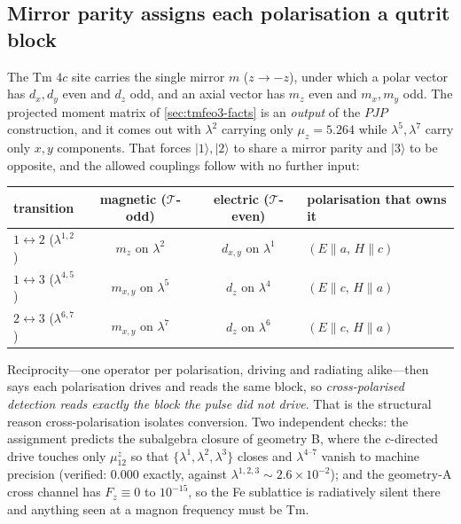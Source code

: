 \documentclass[11pt,a4paper]{article}
\newcommand{\ket}[1]{|#1\rangle}
\begin{document}
\subsection{Mirror parity assigns each polarisation a qutrit block}
\label{sec:blocks}

The Tm $4c$ site carries the single mirror $m$ ($z\to-z$), under which
a polar vector has $d_{x},d_{y}$ even and $d_z$ odd, and an axial
vector has $m_z$ even and $m_{x},m_{y}$ odd.  The projected moment
matrix of \cref{sec:tmfeo3-facts} is an \emph{output} of the $PJP$
construction, and it comes out with $\lambda^2$ carrying only
$\mu_z=5.264$ while $\lambda^5,\lambda^7$ carry only $x,y$ components.
That forces $\ket1,\ket2$ to share a mirror parity and $\ket3$ to be
opposite, and the allowed couplings follow with no further input:
\begin{center}
\renewcommand{\arraystretch}{1.3}
\begin{tabular}{lccl}
\toprule
transition & magnetic ($\mathcal T$-odd) & electric ($\mathcal T$-even)
& polarisation that owns it\\
\midrule
$1\!\leftrightarrow\!2$ ($\lambda^{1,2}$) & $m_z$ on $\lambda^2$ &
  $d_{x,y}$ on $\lambda^1$ & $(E\!\parallel\!a,\,H\!\parallel\!c)$\\
$1\!\leftrightarrow\!3$ ($\lambda^{4,5}$) & $m_{x,y}$ on $\lambda^5$ &
  $d_z$ on $\lambda^4$ & $(E\!\parallel\!c,\,H\!\parallel\!a)$\\
$2\!\leftrightarrow\!3$ ($\lambda^{6,7}$) & $m_{x,y}$ on $\lambda^7$ &
  $d_z$ on $\lambda^6$ & $(E\!\parallel\!c,\,H\!\parallel\!a)$\\
\bottomrule
\end{tabular}
\end{center}
Reciprocity---one operator per polarisation, driving and radiating
alike---then says each polarisation drives and reads the same block, so
\emph{cross-polarised detection reads exactly the block the pulse did
not drive}.  That is the structural reason cross-polarisation isolates
conversion.  Two independent checks: the assignment predicts the
subalgebra closure of geometry B, where the $c$-directed drive touches
only $\mu^z_{12}$ so that $\{\lambda^1,\lambda^2,\lambda^3\}$ closes and
$\lambda^{4\text{--}7}$ vanish to machine precision (verified:
$0.000$ exactly, against $\lambda^{1,2,3}\sim2.6\times10^{-2}$); and
the geometry-A cross channel has $F_z\equiv0$ to $10^{-15}$, so the Fe
sublattice is radiatively silent there and anything seen at a magnon
frequency must be Tm.
\end{document}
